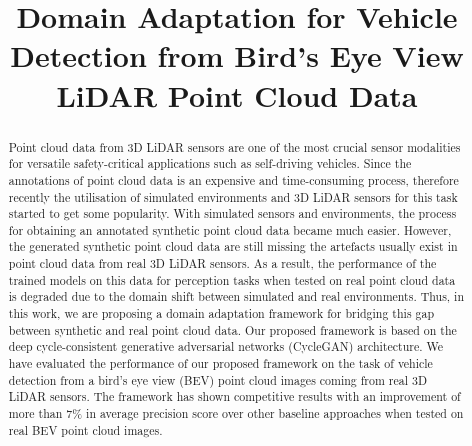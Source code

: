 \documentclass[letterpaper, 10 pt, conference]{IEEEtran}
\begin{document}
	
	\title{\LARGE \bf
		Domain Adaptation for Vehicle Detection from Bird's Eye View LiDAR Point Cloud Data}
	 \author{}
	
	
	
	\maketitle
	
\begin{abstract}
Point cloud data from 3D LiDAR sensors are one
of the most crucial sensor modalities for versatile safety-critical
applications such as self-driving vehicles. Since the annotations
of point cloud data is an expensive and time-consuming process,
therefore recently the utilisation of simulated environments and
3D LiDAR sensors for this task started to get some popularity. With simulated sensors and environments, the process
for obtaining an annotated synthetic point cloud data became
much easier. However, the generated synthetic point cloud data
are still missing the artefacts usually exist in point cloud data
from real 3D LiDAR sensors. As a result, the performance
of the trained models on this data for perception tasks when
tested on real point cloud data is degraded due to the domain
shift between simulated and real environments. Thus, in this
work, we are proposing a domain adaptation framework for
bridging this gap between synthetic and real point cloud data.
Our proposed framework is based on the deep cycle-consistent
generative adversarial networks (CycleGAN) architecture. We
have evaluated the performance of our proposed framework
on the task of vehicle detection from a bird's eye view (BEV)
point cloud images coming from real 3D LiDAR sensors. The framework has shown competitive results with an improvement of more than 7\% in average precision score over other baseline approaches when tested on real BEV point cloud images. 
		
	\end{abstract}
	
	
	
\end{document}
